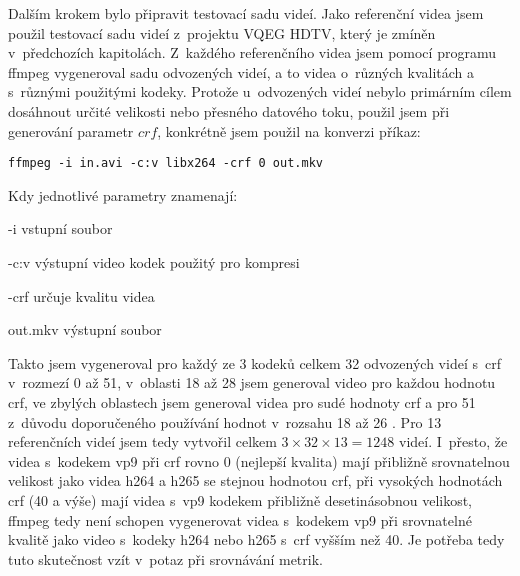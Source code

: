 \documentclass[thesis=M,czech]{FITthesis}[2016/06/26]
\begin{document}
Dalším krokem bylo připravit testovací sadu videí. Jako referenční videa jsem použil testovací sadu videí z~projektu VQEG HDTV\cite{hdtv}, který je zmíněn v~předchozích kapitolách. Z~každého referenčního videa jsem pomocí programu ffmpeg vygeneroval sadu odvozených videí, a to videa o~různých kvalitách a s~různými použitými kodeky. Protože u~odvozených videí nebylo primárním cílem dosáhnout určité velikosti nebo přesného datového toku, použil jsem při generování parametr $\mathit{crf}$, konkrétně jsem použil na konverzi příkaz:
\begin{lstlisting}
ffmpeg -i in.avi -c:v libx264 -crf 0 out.mkv
\end{lstlisting}
Kdy jednotlivé parametry znamenají:
\begin{description}
\item {-i} vstupní soubor
\item {-c:v} výstupní video kodek použitý pro kompresi
\item {-crf} určuje kvalitu videa
\item {out.mkv} výstupní soubor
\end{description}
Takto jsem vygeneroval pro každý ze 3 kodeků celkem 32 odvozených videí s~crf v~rozmezí 0 až 51, v~oblasti 18 až 28 jsem generoval video pro každou hodnotu crf, ve zbylých oblastech jsem generoval videa pro sudé hodnoty crf a pro 51 z~důvodu doporučeného používání hodnot v~rozsahu 18 až 26 \cite{crf}. Pro 13 referenčních videí jsem tedy vytvořil celkem $3 \times 32 \times 13 = 1248$ videí. I~přesto, že videa s~kodekem vp9 při crf rovno 0 (nejlepší kvalita) mají přibližně srovnatelnou velikost jako videa h264 a h265 se stejnou hodnotou crf, při vysokých hodnotách crf (40 a výše) mají videa s~vp9 kodekem přibližně desetinásobnou velikost, ffmpeg tedy není schopen vygenerovat videa s~kodekem vp9 při srovnatelné kvalitě jako video s~kodeky h264 nebo h265 s~crf vyšším než 40. Je potřeba tedy tuto skutečnost vzít v~potaz při srovnávání metrik.
\end{document}
